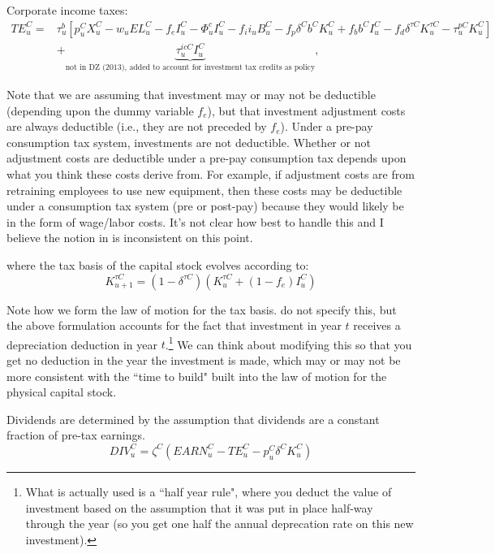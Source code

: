 \documentclass[article,11pt,letterpaper,fleqn]{article}
\theoremstyle{definition}
\numberwithin{equation}{section}
\newcommand{\cn}{\citeasnoun} %
\begin{document}
Corporate income taxes:
\begin{equation}
\label{eqn:corp_tax}
\begin{split}
TE^{C}_{u}= & \tau^{b}_{u}\left[p^{C}_{u}X^{C}_{u}-w_{u}EL^{C}_{u}-f_{e}I^{C}_{u}-\Phi^{c}_{u}I^{C}_{u}-f_{i}i_{u}B^{C}_{u}-f_{p}\delta^{C}b^{C}K^{C}_{u}+f_{b}b^{C}I^{C}_{u}-f_{d}\delta^{\tau C}K^{\tau C}_{u}-\tau^{pC}_{u}K^{C}_{u}\right] \\
& +\underbrace{\tau^{icC}_{u}I^{C}_{u}}_{\text{not in DZ (2013), added to account for investment tax credits as policy}},
\end{split}
\end{equation}

\noindent\noindent  Note that we are assuming that investment may or may not be deductible (depending upon the dummy variable $f_{e}$), but that investment adjustment costs are always deductible (i.e., they are not preceded by $f_{e}$).  Under a pre-pay consumption tax system, investments are not deductible.  Whether or not adjustment costs are deductible under a pre-pay consumption tax depends upon what you think these costs derive from.  For example, if adjustment costs are from retraining employees to use new equipment, then these costs may be deductible under a consumption tax system (pre or post-pay) because they would likely be in the form of wage/labor costs. It's not clear how best to handle this and I believe the notion in \cn{DZ2013} is inconsistent on this point.

\noindent\noindent where the tax basis of the capital stock evolves according to:
\begin{equation}
\label{eqn:lom_taxcapital}
K^{\tau C}_{u+1}=(1-\delta^{\tau C})(K^{\tau C}_{u} + (1-f_{e})I^{C}_{u})
\end{equation}

Note how we form the law of motion for the tax basis.  \cn{DZ2013} do not specify this, but the above formulation accounts for the fact that investment in year $t$ receives a depreciation deduction in year $t$.\footnote{What is actually used is a ``half year rule", where you deduct the value of investment based on the assumption that it was put in place half-way through the year (so you get one half the annual deprecation rate on this new investment).}  We can think about modifying this so that you get no deduction in the year the investment is made, which may or may not be more consistent with the ``time to build" built into the law of motion for the physical capital stock.

Dividends are determined by the assumption that dividends are a constant fraction of pre-tax earnings.
\begin{equation}
\label{eqn:div}
DIV^{C}_{u}=\zeta^{C}(EARN^{C}_{u}-TE^{C}_{u}-p^{C}_{u}\delta^{C}K^{C}_{u})
\end{equation}
\end{document}
